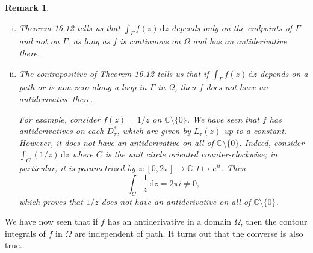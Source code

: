 \documentclass[10pt]{article}
\newcommand{\C}{\mathbb{C}}
\newcommand{\dd}{\,\mathrm{d}}
\theoremstyle{newstyle}
\newtheorem{remark}[thm]{Remark}
\begin{document}
\begin{remark}~
\begin{enumerate}[(i)]
    \item Theorem 16.12 tells us that $\int_\Gamma f(z)\dd z$ depends only on the endpoints of 
    $\Gamma$ and not on $\Gamma$, as long as $f$ is continuous on $\Omega$ and has an 
    antiderivative there.
    \item The contrapositive of Theorem 16.12 tells us that if $\int_\Gamma f(z)\dd z$ depends on
    a path or is non-zero along a loop in $\Gamma$ in $\Omega$, then $f$ does not have an 
    antiderivative there.
    
    For example, consider $f(z) = 1/z$ on $\C \setminus \{0\}$. We have seen that $f$ has 
    antiderivatives on each $D_\tau^*$, which are given by $L_\tau(z)$ up to a constant. 
    However, it does not have an antiderivative on all of $\C \setminus \{0\}$. 
    Indeed, consider $\int_C (1/z)\dd z$ where $C$ is the unit circle oriented counter-clockwise; 
    in particular, it is parametrized by $z : [0, 2\pi] \to \C : t \mapsto e^{it}$. Then 
    \[ \int_C \frac1z\dd z = 2\pi i \neq 0, \]
    which proves that $1/z$ does not have an antiderivative on all of $\C \setminus \{0\}$. 
\end{enumerate}
\end{remark}

We have now seen that if $f$ has an antiderivative in a domain $\Omega$, then the contour 
integrals of $f$ in $\Omega$ are independent of path. It turns out that the converse is also true. 
\end{document}
